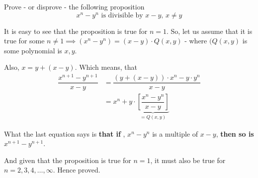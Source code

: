 
\question[4] Prove - or disprove - the following proposition
\[ x^n - y^n \text{ is divisible by } x - y,\, x\neq y\]

\insertQR{}

\begin{solution}
  It is easy to see that the proposition is true for $n=1$. So, let us assume 
  that it is true for some $n\neq 1\implies (x^n-y^n) = (x-y)\cdot Q(x,y)$ - where
  $(Q(x,y)$ is some polynomial is $x,y$.

  Also, $x = y + (x-y)$. Which means, that 
  \begin{align}
    \dfrac{x^{n+1}-y^{n+1}}{x-y} &= 
    \dfrac{(y+(x-y))\cdot x^n - y\cdot y^n}{x-y} \\
    &= x^n + y\cdot\underbrace{\left[ \dfrac{x^n-y^n}{x-y} \right]}_{=Q(x,y)}
  \end{align}

  What the last equation says is \textbf{ that if }, $x^n-y^n$ is a multiple of $x-y$,
  \textbf{ then so is} $x^{n+1}-y^{n+1}$.

  And given that the proposition is true for $n=1$, it must also be true 
  for $n=2,3,4,\ldots,\infty$. Hence proved.
\end{solution}


